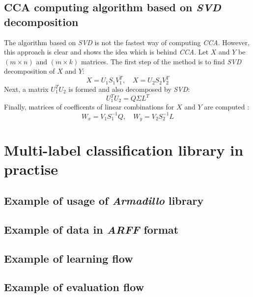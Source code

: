 \begin{appendices}
\newpage
\section{CCA computing algorithm based on \textit{SVD} decomposition}
\label{app:cca}

The algorithm based on \textit{SVD} is not the fastest way of computing \textit{CCA}. However, this approach is clear and shows the idea which is behind \textit{CCA}. Let $X$ and $Y$ be $(m \times n)$ and $(m \times k)$ matrices. The first step of the method is to find \textit{SVD} decomposition of $X$ and $Y$:
\begin{equation}
    X=U_1S_1V^T_1, \quad X=U_2S_2V^T_2
\end{equation}
Next, a matrix $U_1^TU_2$ is formed and also decomposed by \textit{SVD}:
\begin{equation}
    U_1^TU_2 = Q\Sigma{L^T}
\end{equation}
Finally, matrices of coefficents of linear combinations for $X$ and $Y$ are computed \cite{William}:
\begin{equation}
    W_x=V_1S_1^{-1}Q, \quad  W_y=V_2S_2^{-1}L
\end{equation}


\chapter{Multi-label classification library in practise}
\section{Example of usage of \textit{Armadillo} library}
\label{app:arma}


\newpage
\section{Example of data in \textit{ARFF} format}
\label{app:arff}



\newpage
\label{app:learning}
\section{Example of learning flow}


\newpage
\label{app:evaluating}
\section{Example of evaluation flow}


\end{appendices}
